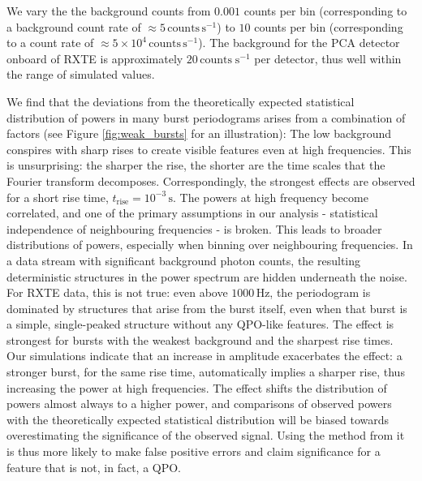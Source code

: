 \documentclass[numberedappendix]{emulateapj}
\newcommand{\hz}{\,\mathrm{Hz}}
\begin{document}
We vary the the background counts from $0.001$ counts per bin (corresponding to a background count rate of $\approx 5 \, \mathrm{counts}\, \mathrm{s}^{-1}$) to $10$ counts per bin (corresponding to a count rate of $\approx 5 \times 10^{4}\, \mathrm{counts}\, \mathrm{s}^{-1}$). The background for the PCA detector onboard of RXTE is approximately $20\, \mathrm{counts}\; \mathrm{s}^{-1}$ per detector, thus well within the range of simulated values.


We find that the deviations from the theoretically expected statistical distribution of powers in many burst periodograms arises from a combination of factors (see Figure \ref{fig:weak_bursts} for an illustration): The low background conspires with sharp rises to create visible features even at high frequencies. This is unsurprising: the sharper the rise, the shorter are the time scales that the Fourier transform decomposes. Correspondingly, the strongest effects are observed for a short rise time, $t_{\mathrm{rise}} = 10^{-3}\,\mathrm{s}$. The powers at high frequency become correlated, and one of the primary assumptions in our analysis - statistical independence of neighbouring frequencies - is broken. This leads to broader distributions of powers, especially when binning over neighbouring frequencies. In a data stream with significant background photon counts, the resulting deterministic structures in the power spectrum are hidden underneath the noise. For RXTE data, this is not true: even above $1000\hz$, the periodogram is dominated by structures that arise from the burst itself, even when that burst is a simple, single-peaked structure without any QPO-like features. The effect is strongest for bursts with the weakest background and the sharpest rise times. Our simulations indicate that an increase in amplitude exacerbates the effect: a stronger burst, for the same rise time, automatically implies a sharper rise, thus increasing the power at high frequencies. The effect shifts the distribution of powers almost always to a higher power, and comparisons of observed powers with the theoretically expected statistical distribution will be biased towards overestimating the significance of the observed signal. Using the method from \citet{huppenkothen2013} it is thus more likely to make false positive errors and claim significance for a feature that is not, in fact, a QPO.
\end{document}
